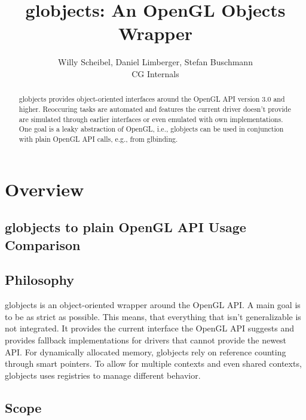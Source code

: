 \documentclass{article}
\begin{document}
\title{globjects: An OpenGL Objects Wrapper}
\author{Willy Scheibel, Daniel Limberger, Stefan Buschmann\\CG Internals}

\maketitle

\begin{abstract}
\noindent
globjects provides object-oriented interfaces around the OpenGL API version 3.0 and higher. Reoccuring tasks are automated and features the current driver doesn't provide are simulated through earlier interfaces or even emulated with own implementations. One goal is a leaky abstraction of OpenGL, i.e., globjects can be used in conjunction with plain OpenGL API calls, e.g., from glbinding.

\end{abstract}

\setcounter{tocdepth}{2}
\tableofcontents

\newpage

\section{Overview}

\subsection{globjects to plain OpenGL API Usage Comparison}

\subsection{Philosophy}

globjects is an object-oriented wrapper around the OpenGL API. A main goal is to be as strict as possible. This means, that everything that isn't generalizable is not integrated. It provides the current interface the OpenGL API suggests and provides fallback implementations for drivers that cannot provide the newest API. For dynamically allocated memory, globjects rely on reference counting through smart pointers. To allow for multiple contexts and even shared contexts, globjects uses registries to manage different behavior.

\subsection{Scope}
\end{document}
